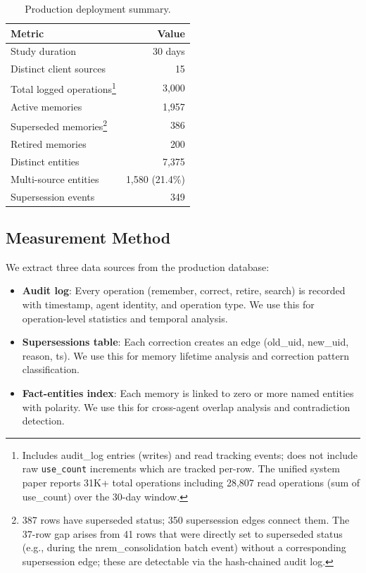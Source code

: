 \documentclass[11pt]{article}
\begin{document}
\begin{table}[h]
\centering
\caption{Production deployment summary.}
\label{tab:deployment}
\begin{tabular}{lr}
\toprule
Metric & Value \\
\midrule
Study duration & 30 days \\
Distinct client sources & 15 \\
Total logged operations\footnote{Includes audit\_log entries (writes) and read tracking events; does not include raw \texttt{use\_count} increments which are tracked per-row. The unified system paper reports 31K+ total operations including 28,807 read operations (sum of use\_count) over the 30-day window.} & 3,000 \\
Active memories & 1,957 \\
Superseded memories\footnote{387 rows have superseded status; 350 supersession edges connect them. The 37-row gap arises from 41 rows that were directly set to superseded status (e.g., during the nrem\_consolidation batch event) without a corresponding supersession edge; these are detectable via the hash-chained audit log.} & 386 \\
Retired memories & 200 \\
Distinct entities & 7,375 \\
Multi-source entities & 1,580 (21.4\%) \\
Supersession events & 349 \\
\bottomrule
\end{tabular}
\end{table}

\subsection{Measurement Method}

We extract three data sources from the production database:

\begin{itemize}
\item \textbf{Audit log}: Every operation (remember, correct, retire, search) is recorded with timestamp, agent identity, and operation type. We use this for operation-level statistics and temporal analysis.
\item \textbf{Supersessions table}: Each correction creates an edge (old\_uid, new\_uid, reason, ts). We use this for memory lifetime analysis and correction pattern classification.
\item \textbf{Fact-entities index}: Each memory is linked to zero or more named entities with polarity. We use this for cross-agent overlap analysis and contradiction detection.
\end{itemize}
\end{document}
